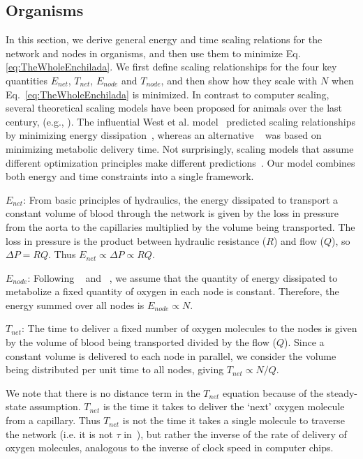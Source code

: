 \documentclass[12pt]{article}
\begin{document}
\subsection{Organisms}
\label{sec:organisms}

In this section, we derive general energy and time scaling relations for the
network and nodes in organisms, and then use them to minimize Eq.
\ref{eq:TheWholeEnchilada}.  We first define scaling relationships for the four
key quantities $E_{net}$, $T_{net}$, $E_{node}$ and $T_{node}$, and
then show
how they scale with $N$ when Eq.~\ref{eq:TheWholeEnchilada} is minimized.
In contrast to computer scaling, several theoretical scaling models have been proposed for animals over the last century, (e.g., \cite{thompson1942arcy, west97, banavar1999size, dodds2010optimal, banavar10}). The influential West et al. model~\cite{west97} predicted
scaling relationships by minimizing energy dissipation~\cite{west97},
whereas an alternative ~\cite{banavar10} was based on minimizing metabolic delivery time. Not surprisingly, scaling models that assume different optimization principles make different predictions~\cite{newberry2015testing}.  Our model
combines both energy and time constraints into a single framework.

$E_{net}$: From basic principles of hydraulics, the energy dissipated to
transport a constant volume of blood through the network is given by the loss
in pressure from the aorta to the capillaries multiplied by the volume being
transported.  The loss in pressure is the product between hydraulic resistance ($R$) and
flow ($Q$), so $\Delta P = RQ$.  Thus $E_{net} \propto
\Delta P \propto RQ$. 

$E_{node}$: Following ~\cite{west97} and ~\cite{moses08}, we assume that the
quantity of energy dissipated to metabolize a fixed quantity of oxygen in each
node is constant.  Therefore, the energy summed over all nodes is $E_{node} \propto
N$.

$T_{net}$: The time to deliver a fixed number of oxygen molecules to the nodes
is given by the volume of blood being transported divided by the flow ($Q$).
Since a constant volume is delivered to each node in parallel, we consider the
volume being distributed per unit time to all nodes, giving $T_{net}\propto
N/Q$.  

We note that there is no distance term in the $T_{net}$ equation because of the
steady-state assumption. $T_{net}$ is the time it takes to deliver the `next'
oxygen molecule from a capillary. Thus $T_{net}$ is not the time it takes a
single molecule to traverse the network (i.e. it is not $\tau$
in~\cite{banavar10}), but rather the inverse of the rate of delivery of
oxygen molecules, analogous to the inverse of clock speed in computer chips.
\end{document}
